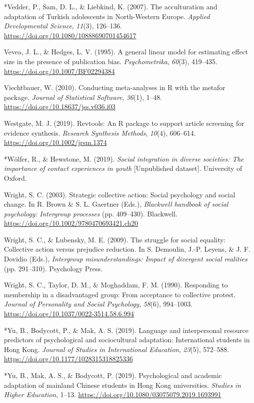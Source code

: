 \documentclass[12pt, letterpaper]{article}
\begin{document}
\leavevmode\hypertarget{ref-829}{}%
*Vedder, P., Sam, D. L., \& Liebkind, K. (2007). The acculturation and
adaptation of Turkish adolescents in North-Western Europe. \emph{Applied
Developmental Science}, \emph{11}(3), 126--136.
\url{https://doi.org/10.1080/10888690701454617}

\leavevmode\hypertarget{ref-vevea_general_1995}{}%
Vevea, J. L., \& Hedges, L. V. (1995). A general linear model for
estimating effect size in the presence of publication bias.
\emph{Psychometrika}, \emph{60}(3), 419--435.
\url{https://doi.org/10.1007/BF02294384}

\leavevmode\hypertarget{ref-viechtbauer_conducting_2010}{}%
Viechtbauer, W. (2010). Conducting meta-analyses in R with the metafor
package. \emph{Journal of Statistical Software}, \emph{36}(1), 1--48.
\url{https://doi.org/10.18637/jss.v036.i03}

\leavevmode\hypertarget{ref-westgate_revtools:_2019}{}%
Westgate, M. J. (2019). Revtools: An R package to support article
screening for evidence synthesis. \emph{Research Synthesis Methods},
\emph{10}(4), 606--614. \url{https://doi.org/10.1002/jrsm.1374}

\leavevmode\hypertarget{ref-2383}{}%
*Wölfer, R., \& Hewstone, M. (2019). \emph{Social integration in diverse
societies: The importance of contact experiences in youth}
{[}Unpublished dataset{]}. University of Oxford.

\leavevmode\hypertarget{ref-brown_strategic_2003}{}%
Wright, S. C. (2003). Strategic collective action: Social psychology and
social change. In R. Brown \& S. L. Gaertner (Eds.), \emph{Blackwell
handbook of social psychology: Intergroup processes} (pp. 409--430).
Blackwell. \url{https://doi.org/10.1002/9780470693421.ch20}

\leavevmode\hypertarget{ref-wright_struggle_2009}{}%
Wright, S. C., \& Lubensky, M. E. (2009). The struggle for social
equality: Collective action versus prejudice reduction. In S. Demoulin,
J.-P. Leyens, \& J. F. Dovidio (Eds.), \emph{Intergroup
misunderstandings: Impact of divergent social realities} (pp. 291--310).
Psychology Press.

\leavevmode\hypertarget{ref-wright_responding_1990}{}%
Wright, S. C., Taylor, D. M., \& Moghaddam, F. M. (1990). Responding to
membership in a disadvantaged group: From acceptance to collective
protest. \emph{Journal of Personality and Social Psychology},
\emph{58}(6), 994--1003.
\url{https://doi.org/10.1037/0022-3514.58.6.994}

\leavevmode\hypertarget{ref-1395}{}%
*Yu, B., Bodycott, P., \& Mak, A. S. (2019). Language and interpersonal
resource predictors of psychological and sociocultural adaptation:
International students in Hong Kong. \emph{Journal of Studies in
International Education}, \emph{23}(5), 572--588.
\url{https://doi.org/10.1177/1028315318825336}

\leavevmode\hypertarget{ref-3000}{}%
*Yu, B., Mak, A. S., \& Bodycott, P. (2019). Psychological and academic
adaptation of mainland Chinese students in Hong Kong universities.
\emph{Studies in Higher Education}, 1--13.
\url{https://doi.org/10.1080/03075079.2019.1693991}

\endgroup
\end{document}
